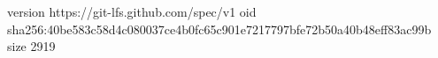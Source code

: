 version https://git-lfs.github.com/spec/v1
oid sha256:40be583c58d4c080037ce4b0fc65c901e7217797bfe72b50a40b48eff83ac99b
size 2919

